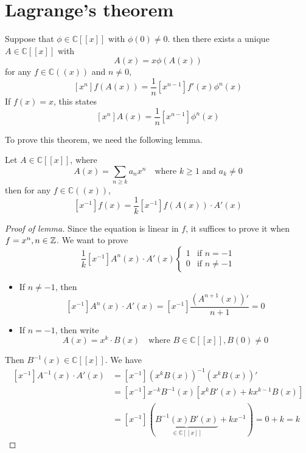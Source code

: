 \section{Lagrange's theorem}
\begin{theorem}
Suppose that \(\phi\in\mathbb{C}[[x]]\) with \(\phi(0)\neq0\).
then there exists a unique \(A\in\mathbb{C}[[x]]\) with
\[ A(x)=x\phi(A(x)) \]
for any \(f\in\mathbb{C}((x))\) and \(n\neq0\),
\[ \left[x^n\right]f(A(x))=\frac{1}{n}\left[x^{n-1}\right]f'(x)\phi^n(x) \]
If \(f(x)=x\), this states
\[ \left[x^n\right]A(x)=\frac{1}{n}\left[x^{n-1}\right]\phi^n(x) \]
\end{theorem}

To prove this theorem, we need the following lemma.
\begin{lemma}
\label{residue composition}
Let \(A\in\mathbb{C}[[x]]\), where
\[ A(x)=\sum_{n\geq k}a_n x^n \quad \text{where } k\geq1 \text{ and } a_k\neq0 \]
then for any \(f\in\mathbb{C}((x))\),
\[ \left[x^{-1}\right]f(x)=\frac{1}{k}\left[x^{-1}\right]f(A(x))\cdot A'(x) \]
\end{lemma}
\begin{proof}[Proof of lemma]
Since the equation is linear in \(f\), it suffices to prove it when \(f=x^n,n\in\mathbb{Z}\).
We want to prove
\[ \frac{1}{k}\left[x^{-1}\right]A^n(x)\cdot A'(x)\begin{cases} 1 & \text{if } n=-1 \\ 0 & \text{if } n\neq-1\end{cases} \]
\begin{itemize}
\item If \(n\neq-1\), then
\[ \left[x^{-1}\right]A^n(x)\cdot A'(x)=\left[x^{-1}\right]\frac{\left(A^{n+1}(x)\right)'}{n+1}=0 \]
\item If \(n=-1\), then write
\[ A(x)=x^k\cdot B(x) \quad \text{where } B\in\mathbb{C}[[x]], B(0)\neq0 \]
\end{itemize}
Then \(B^{-1}(x)\in\mathbb{C}[[x]]\).
We have
\begin{align*}
\left[x^{-1}\right]A^{-1}(x)\cdot A'(x)&=\left[x^{-1}\right]\left(x^kB(x)\right)^{-1}\left(x^kB(x)\right)'\\
&=\left[x^{-1}\right]x^{-k}B^{-1}(x)\left[x^kB'(x)+kx^{k-1}B(x)\right]\\
&=\left[x^{-1}\right](\underbrace{B^{-1}(x)B'(x)}_{\in\mathbb{C}[[x]]}+kx^{-1})=0+k=k
\end{align*}
\end{proof}

